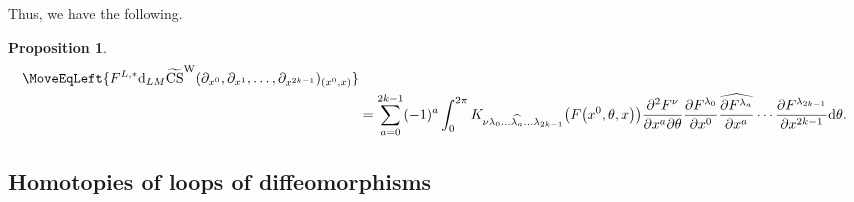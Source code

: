 \documentclass[10pt,a4paper]{amsart}
\numberwithin{equation}{section}
\newtheorem{Proposition}[Theorem]{Proposition}
\theoremstyle{definition}
\newcommand{\bm}{ M}
\newcommand{\ocs}{\widetilde{{\rm CS}}}
\begin{document}
Thus, we have the following.

\begin{Proposition}%
\begin{align}
\MoveEqLeft{F^{L,*} {\rm d}_{L{\bm}} \ocs^{\rm W}
(\partial_{x^0}, \partial_{x^1},
\dots, \partial_{x^{2k-1}})_{(x^0,x)}}\nonumber\\
&=
\sum_{a=0}^{2k-1} (-1)^a
\int_0^{2\pi}
K_{\nu \lambda_0 \dots \widehat{\lambda_a} \dots \lambda_{2k-1}}
\bigl(F\bigl(x^0, \theta , x\bigr)\bigr)
\frac{\partial^2 F^\nu}{\partial x^a \partial \theta}
\frac{\partial F^{\lambda_0}}{\partial x^0}
\widehat{\frac{\partial F^{\lambda_a}}{\partial x^a}}
\cdots
\frac{\partial F^{\lambda_{2k-1}}}{\partial x^{2k-1}}
 {\rm d}\theta.\!\!\!\label{eq:four}
\end{align}
\end{Proposition}

\subsection{Homotopies of loops of diffeomorphisms}%
\end{document}

